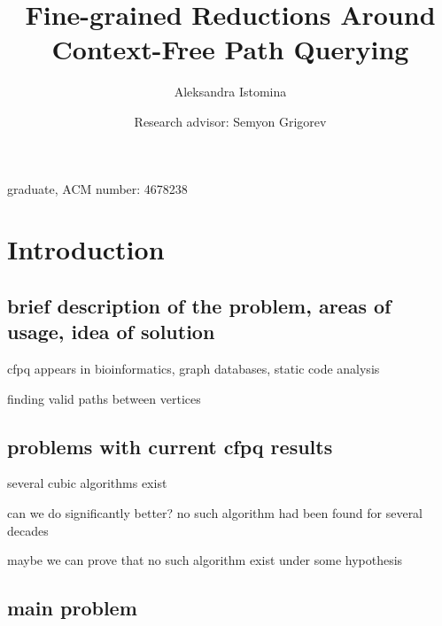 \documentclass[acmsmall,review,nonacm]{acmart}\settopmatter{printfolios=true,printccs=false,printacmref=false}
\begin{document}
	
	\title{Fine-grained Reductions Around Context-Free Path Querying}
	
	\author{Aleksandra Istomina}

    \author{Research advisor: Semyon Grigorev}
	
	\newcommand\todo[1]{{\color{violet}#1}}
	\newcommand\db[1]{{\color{red}#1}}
	\newcommand\question[1]{{\color{cyan}#1}}


	\maketitle
	
	\todo{graduate, ACM number: 4678238}
	
	\section{Introduction}
	
	\subsection{\todo{brief description of the problem, areas of usage, idea of solution}}
	
	cfpq appears in bioinformatics, graph databases, static code analysis
	
	finding valid paths between vertices
	
	\subsection{\todo{problems with current cfpq results}}
	
	several cubic algorithms exist
	
	can we do significantly better? no such algorithm had been found for several decades
	
	maybe we can prove that no such algorithm exist under some hypothesis
	
	\subsection{\todo{main problem}}
	
\end{document}
